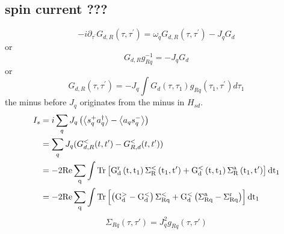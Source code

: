 \subsection{spin current ???}
\begin{equation}
-i \partial_{\tau^{\prime}} G_{d, R}\left(\tau, \tau^{\prime}\right)=\omega_{q} G_{d, R}\left(\tau, \tau^{\prime}\right)-J_{q} G_{d}
\end{equation}
or
\begin{equation}
G_{d, R} g_{R q}^{-1}=-J_{q} G_{d}
\end{equation}
or
\begin{equation}
G_{d, R}\left(\tau, \tau^{\prime}\right)=-J_{q} \int G_{d}\left(\tau, \tau_{1}\right) g_{R q}\left(\tau_{1}, \tau^{\prime}\right) d \tau_{1}
\end{equation}
the minus before $J_{q}$ originates from the minus in $H_{sd}$.
\begin{equation}
\begin{split}
I_{s}&= i \sum_{q} J_{q}\left(\left\langle s_{q}^{+} a_{q}^{\dagger}\right\rangle-\left\langle a_{q} s_{q}^{-}\right\rangle\right) \\
&=\sum_{q}J_{q}(G_{d,R}^{<}(t,t')-G_{R,d}^{<}(t,t')) \\
&=-2\rm{Re}\sum_{q} \int \operatorname{Tr}\left[G_{d}^{r}\left(t, t_{1}\right) \Sigma_{R}^{<}\left(t_{1}, t^{\prime}\right)+G_{d}^{<}\left(t, t_{1}\right) \Sigma_{R}^{a}\left(t_{1}, t^{\prime}\right)\right] d t_{1}\\
&= -2\rm{Re}\sum_{q} \int\operatorname{Tr}\left[\left(G_{d}^{>}-G_{d}^{<}\right) \Sigma_{R q}^{<}+G_{d}^{<}\left(\Sigma_{R q}^{a}-\Sigma_{R q}^{r}\right)\right] d t_{1}
\end{split}
\end{equation}
\begin{equation}
\Sigma_{Rq}(\tau, \tau')=J_{q}^{2}g_{Rq}(\tau, \tau')
\end{equation}
